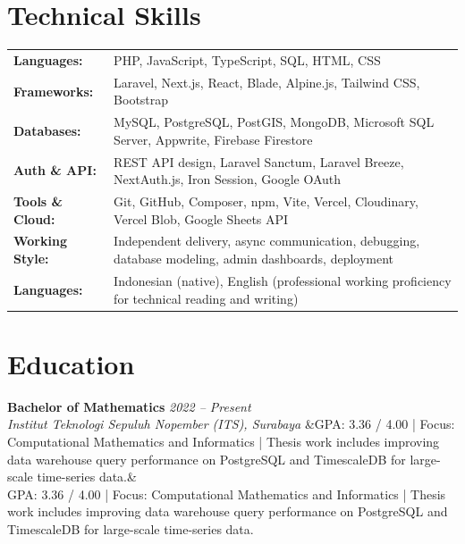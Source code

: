 \documentclass[a4paper,11pt]{article}
\newcommand{\cventry}[4]{%
  \noindent\textbf{#1} \hfill \textit{#3} \\
  \textit{#2}
  \ifx&#4& \else \\ \small #4 \fi
  \vspace{6pt}
}
\begin{document}
\section{Technical Skills}
\begin{tabularx}{\textwidth}{@{}l X@{}}
\textbf{Languages:} & PHP, JavaScript, TypeScript, SQL, HTML, CSS \\[3pt]
\textbf{Frameworks:} & Laravel, Next.js, React, Blade, Alpine.js, Tailwind CSS, Bootstrap \\[3pt]
\textbf{Databases:} & MySQL, PostgreSQL, PostGIS, MongoDB, Microsoft SQL Server, Appwrite, Firebase Firestore \\[3pt]
\textbf{Auth \& API:} & REST API design, Laravel Sanctum, Laravel Breeze, NextAuth.js, Iron Session, Google OAuth \\[3pt]
\textbf{Tools \& Cloud:} & Git, GitHub, Composer, npm, Vite, Vercel, Cloudinary, Vercel Blob, Google Sheets API \\[3pt]
\textbf{Working Style:} & Independent delivery, async communication, debugging, database modeling, admin dashboards, deployment \\[3pt]
\textbf{Languages:} & Indonesian (native), English (professional working proficiency for technical reading and writing) \\
\end{tabularx}

\section{Education}
\cventry
  {Bachelor of Mathematics}
  {Institut Teknologi Sepuluh Nopember (ITS), Surabaya}
  {2022 -- Present}
  {GPA: 3.36 / 4.00 | Focus: Computational Mathematics and Informatics | Thesis work includes improving data warehouse query performance on PostgreSQL and TimescaleDB for large-scale time-series data.}
\end{document}
